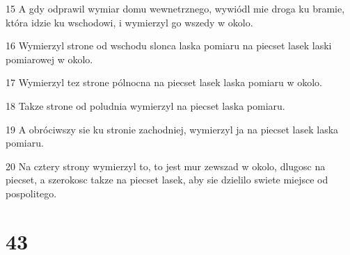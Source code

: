 \par 15 A gdy odprawil wymiar domu wewnetrznego, wywiódl mie droga ku bramie, która idzie ku wschodowi, i wymierzyl go wszedy w okolo.
\par 16 Wymierzyl strone od wschodu slonca laska pomiaru na piecset lasek laski pomiarowej w okolo.
\par 17 Wymierzyl tez strone pólnocna na piecset lasek laska pomiaru w okolo.
\par 18 Takze strone od poludnia wymierzyl na piecset laska pomiaru.
\par 19 A obróciwszy sie ku stronie zachodniej, wymierzyl ja na piecset lasek laska pomiaru.
\par 20 Na cztery strony wymierzyl to, to jest mur zewszad w okolo, dlugosc na piecset, a szerokosc takze na piecset lasek, aby sie dzielilo swiete miejsce od pospolitego.

\chapter{43}

